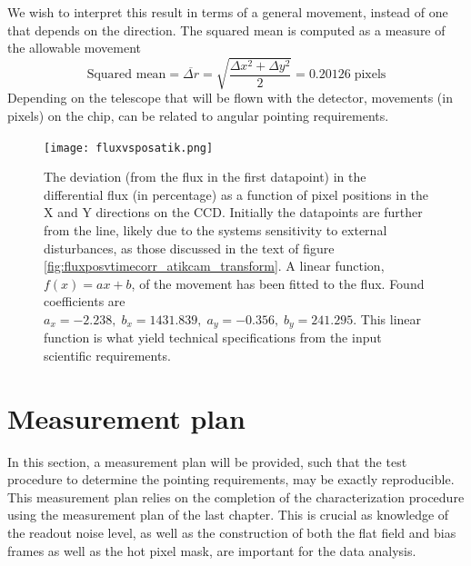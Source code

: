 \documentclass[../main.tex]{subfiles}
\begin{document}
We wish to interpret this result in terms of a general movement, instead of one that depends on the direction. The squared mean is computed as a measure of the allowable movement
\begin{equation}
	\text{Squared mean} =  \overline{\Delta r} = \sqrt{\frac{\Delta x^2 + \Delta y^2 }{2}} = 0.20126\; \text{pixels}
\end{equation}
Depending on the telescope that will be flown with the detector, movements (in pixels) on the chip, can be related to angular pointing requirements. 
\begin{figure}[h!]
	\centering
	\texttt{[image: fluxvsposatik.png]}
	\caption{The deviation (from the flux in the first datapoint) in the differential flux (in percentage) as a function of pixel positions in the X and Y directions on the CCD. Initially the datapoints are further from the line, likely due to the systems sensitivity to external disturbances, as those discussed in the text of figure \ref{fig:fluxposvtimecorr_atikcam_transform}. A linear function, $f(x) = ax + b$, of the movement has been fitted to the flux. Found coefficients are $a_x = -2.238,\;b_x =  1431.839,\;a_y = -0.356,\;b_y =  241.295$. This linear function is what yield technical specifications from the input scientific requirements.}
	\label{fig:fluxvsPosatik}
\end{figure}
\clearpage
\section{Measurement plan}\label{sec:attmeasplan}
In this section, a measurement plan will be provided, such that the test procedure to determine the pointing requirements, may be exactly reproducible. This measurement plan relies on the completion of the characterization procedure using the measurement plan of the last chapter. This is crucial as knowledge of the readout noise level, as well as the construction of both the flat field and bias frames as well as the hot pixel mask, are important for the data analysis.
\end{document}
